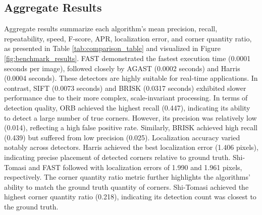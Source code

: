 \documentclass[journal]{IEEEtran}
\begin{document}
\subsection{Aggregate Results}
Aggregate results summarize each algorithm’s mean precision, recall, repeatability, speed, F-score, APR, localization error, and corner quantity ratio, as presented in Table \ref{tab:comparison_table} and visualized in Figure \ref{fig:benchmark_results}. FAST demonstrated the fastest execution time (0.0001 seconds per image), followed closely by AGAST (0.0002 seconds) and Harris (0.0004 seconds). These detectors are highly suitable for real-time applications. In contrast, SIFT (0.0073 seconds) and BRISK (0.0317 seconds) exhibited slower performance due to their more complex, scale-invariant processing. In terms of detection quality, ORB achieved the highest recall (0.447), indicating its ability to detect a large number of true corners. However, its precision was relatively low (0.014), reflecting a high false positive rate. Similarly, BRISK achieved high recall (0.439) but suffered from low precision (0.025). Localization accuracy varied notably across detectors. Harris achieved the best localization error (1.406 pixels), indicating precise placement of detected corners relative to ground truth. Shi-Tomasi and FAST followed with localization errors of 1.990 and 1.961 pixels, respectively. The corner quantity ratio metric further highlights the algorithms' ability to match the ground truth quantity of corners. Shi-Tomasi achieved the highest corner quantity ratio (0.218), indicating its detection count was closest to the ground truth.


\begin{figure}[h]
    \centering
\end{figure}
\end{document}
